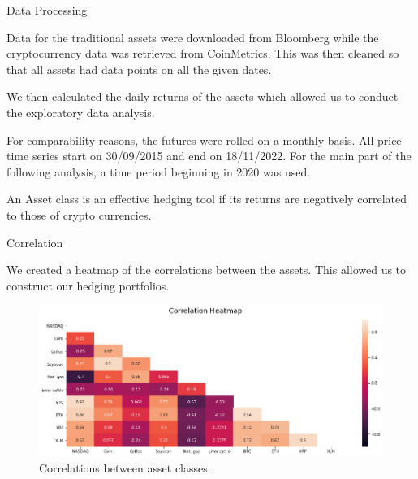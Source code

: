 \begin{frame}{Data Processing}
    \begin{block}{}
        Data for the traditional assets were downloaded from Bloomberg while the cryptocurrency data was retrieved from CoinMetrics. This was then cleaned so that all assets had data points on all the given dates.
    \end{block}   
    \begin{block}{}
       We then calculated the daily returns of the assets which allowed us to conduct the exploratory data analysis.
    \end{block} 
    \begin{block}{}
        For comparability reasons, the futures were rolled on a monthly basis. All price time series start on 30/09/2015 and end on 18/11/2022. For the main part of the following analysis, a time period
beginning in 2020 was used.
    \end{block} 
 \begin{alertblock}{}
    An Asset class is an effective hedging tool if its returns are negatively correlated to those of crypto currencies.
    \end{alertblock} 
\end{frame}

\begin{frame}{Correlation}
    \begin{block}{}
     We created a heatmap of the correlations between the assets. This allowed us to construct our hedging portfolios.
    \end{block} 
    
\begin{figure}
        \centering
    \includegraphics[scale=0.35]{images/illustrate/heatmap_small.png}
        \caption{Correlations between asset classes.}
\end{figure}
\end{frame}

